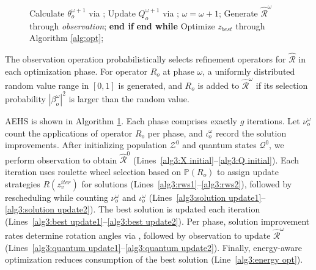 \documentclass{IEEEtaes}
\begin{document}
\begin{figure}[!t]
\begin{algorithm}[H]
\begin{algorithmic}[1]
        \STATE \quad\quad Calculate $\theta_o^{\omega+1}$ via ;
        \STATE \quad\quad Update $Q^{\omega+1}_o$ via ;
        \STATE \quad\quad $\omega=\omega+1$;
        \STATE \quad\quad Generate $\hat{\mathcal{R}}^\omega$ through \textit{observation};
        \STATE \quad \textbf{end if}
        \label{alg3:quantum update2}
    \STATE \textbf{end while}
    \STATE Optimize $z_{best}$ through Algorithm \ref{alg:opt};
    \label{alg3:energy opt}
    \end{algorithmic}
    \label{alg:alg}
\end{algorithm}
\end{figure}

The observation operation probabilistically selects refinement operators for $\hat{\mathcal{R}}$ in each optimization phase. For operator $R_o$ at phase $\omega$, a uniformly distributed random value range in $[0,1]$ is generated, and $R_o$ is added to $\hat{\mathcal{R}}^\omega$ if its selection probability $\left|\beta_o^\omega\right|^2$ is larger than the random value.

AEHS is shown in Algorithm \ref{alg:alg}. Each phase comprises exactly $g$ iterations. Let $\nu_o^\omega$ count the applications of operator $R_o$ per phase, and $\iota_o^\omega$ record the solution improvements. After initializing population $\mathcal{Z}^{0}$ and quantum states $\mathcal{Q}^0$, we perform observation to obtain $\hat{\mathcal{R}}^0$ (Lines~\ref{alg3:X initial}–\ref{alg3:Q initial}). Each iteration uses roulette wheel selection based on $\mathbb{P}(R_o)$ to assign update strategies $R(z^{iter}_v)$ for solutions (Lines~\ref{alg3:rws1}–\ref{alg3:rws2}), followed by rescheduling while counting $\nu_o^\omega$ and $\iota_o^\omega$ (Lines~\ref{alg3:solution update1}–\ref{alg3:solution update2}). The best solution is updated each iteration (Lines~\ref{alg3:best update1}–\ref{alg3:best update2}). Per phase, solution improvement rates determine rotation angles via , followed by observation to update $\hat{\mathcal{R}}^\omega$ (Lines~\ref{alg3:quantum update1}–\ref{alg3:quantum update2}). Finally, energy-aware optimization reduces consumption of the best solution (Line~\ref{alg3:energy opt}).

\end{document}
